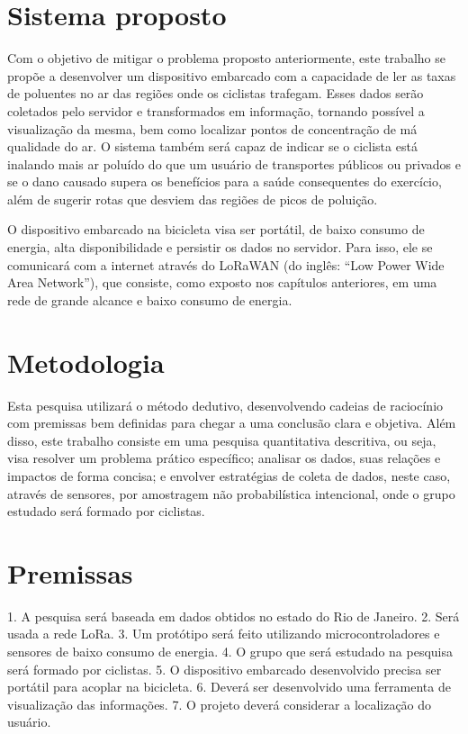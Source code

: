 
\section{Sistema proposto}

Com o objetivo de mitigar o problema proposto anteriormente, este trabalho se propõe a desenvolver 
um dispositivo embarcado com a capacidade de ler as taxas de poluentes no ar das regiões onde os 
ciclistas trafegam. Esses dados serão coletados pelo servidor e transformados em informação, tornando 
possível a visualização da mesma, bem como localizar pontos de concentração de má qualidade do ar. 
O sistema também será capaz de indicar se o ciclista está inalando mais ar poluído do que um usuário 
de transportes públicos ou privados e se o dano causado supera os benefícios para a saúde 
consequentes do exercício, além de sugerir rotas que desviem das regiões de picos de poluição.

O dispositivo embarcado na bicicleta visa ser portátil, de baixo consumo de energia, alta 
disponibilidade e persistir os dados no servidor. Para isso, ele se comunicará com a internet 
através do LoRaWAN (do inglês: ``Low Power Wide Area Network''), que consiste, como exposto nos 
capítulos anteriores, em uma rede de grande alcance e baixo consumo de energia.

\section{Metodologia}

Esta pesquisa utilizará o método dedutivo, desenvolvendo cadeias de raciocínio com premissas bem 
definidas para chegar a uma conclusão clara e objetiva. Além disso, este trabalho consiste em uma 
pesquisa quantitativa descritiva, ou seja, visa resolver um problema prático específico; analisar os 
dados, suas relações e impactos de forma concisa; e envolver estratégias de coleta de dados, neste 
caso, através de sensores, por amostragem não probabilística intencional, onde o grupo estudado será 
formado por ciclistas.

\section{Premissas}

1. A pesquisa será baseada em dados obtidos no estado do Rio de Janeiro.
2. Será usada a rede LoRa.
3. Um protótipo será feito utilizando microcontroladores e sensores de baixo consumo de energia.
4. O grupo que será estudado na pesquisa será formado por ciclistas.
5. O dispositivo embarcado desenvolvido precisa ser portátil para acoplar na bicicleta.
6. Deverá ser desenvolvido uma ferramenta de visualização das informações.
7. O projeto deverá considerar a localização do usuário.